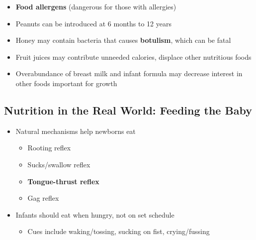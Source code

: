 \documentclass[12pt]{article}
\begin{document}
\begin{itemize}
\begin{itemize}
                        \item \textbf{Food allergens} (dangerous for those with allergies)
                        \item Peanuts can be introduced at 6 months to 12 years
                        \item Honey may contain bacteria that causes \textbf{botulism}, which can be fatal
                        \item Fruit juices may contribute unneeded calories, displace other nutritious foods
                        \item Overabundance of breast milk and infant formula may decrease interest in other foods important for growth
                    \end{itemize}
            \end{itemize}

        \subsection{Nutrition in the Real World: Feeding the Baby}
            \begin{itemize}
                \item Natural mechanisms help newborns eat
                    \begin{itemize}
                        \item Rooting reflex
                        \item Sucks/swallow reflex
                        \item \textbf{Tongue-thrust reflex}
                        \item Gag reflex
                    \end{itemize}
                \item Infants should eat when hungry, not on set schedule
                    \begin{itemize}
                        \item Cues include waking/tossing, sucking on fist, crying/fussing
                    \end{itemize}
            \end{itemize}
\end{document}
